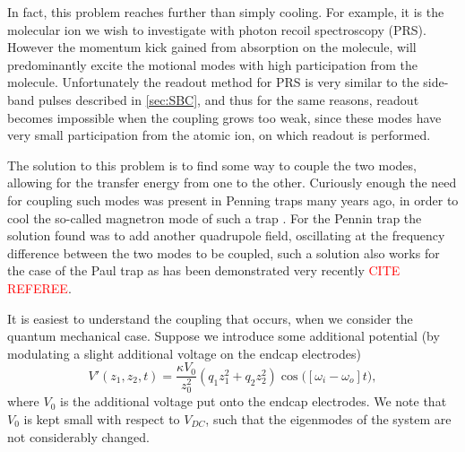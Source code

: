 In fact, this problem reaches further than simply cooling. For example, it is the molecular ion we wish to investigate with photon recoil spectroscopy (PRS). However the momentum kick gained from absorption on the molecule, will predominantly excite the motional modes with high participation from the molecule.
Unfortunately the readout method for PRS is very similar to the side-band pulses described in \cref{sec:SBC}, and thus for the same reasons, readout becomes impossible when the coupling grows too weak, since these modes have very small participation from the atomic ion, on which readout is performed.


The solution to this problem is to find some way to couple the two modes, allowing for the transfer energy from one to the other. Curiously enough the need for coupling such modes was present in Penning traps many years ago, in order to cool the so-called magnetron mode of such a trap \cite{PenningTrap,DehmeltPenningCool}. For the Pennin trap the solution found was to add another quadrupole field, oscillating at the frequency difference between the two modes to be coupled, such a solution also works for the case of the Paul trap as has been demonstrated very recently \textcolor{red}{CITE REFEREE}.

It is easiest to understand the coupling that occurs, when we consider the quantum mechanical case. Suppose we introduce some additional potential (by modulating a slight additional voltage on the endcap electrodes)
\begin{equation}
    V'(z_1,z_2,t) = \frac{\kappa V_0}{z_0^2}(q_1z_1^2+q_2z_2^2)\cos{\big([\omega_i-\omega_o]t\big)}\label{eq:couplingPot},
\end{equation}
where $V_0$ is the additional voltage put onto the endcap electrodes. We note that $V_0$ is kept small with respect to $V_{DC}$, such that the eigenmodes of the system are not considerably changed.

